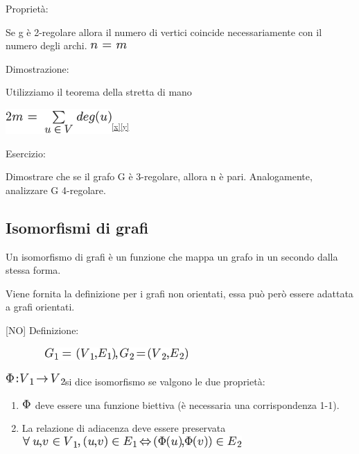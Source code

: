 \documentclass{article}
\providecommand{\tightlist}{%
  \setlength{\itemsep}{0pt}\setlength{\parskip}{0pt}}
\begin{document}
{}

{Proprietà}{: }

{Se g è 2-regolare allora il numero di vertici coincide necessariamente
con il numero degli archi. }\includegraphics{images/image424.png}

{}

{Dimostrazione}{: }

{Utilizziamo il teorema della stretta di mano}

\includegraphics{images/image425.png}\textsuperscript{\protect\hyperlink{cmnt24}{{[}x{]}}\protect\hyperlink{cmnt25}{{[}y{]}}}

{}

{Esercizio}{:}

{Dimostrare che se il grafo G è 3-regolare, allora n è pari.
Analogamente, analizzare G 4-regolare. }

{}

\hypertarget{h.d5v408sc7po0}{\subsection{\texorpdfstring{{Isomorfismi di
grafi}}{Isomorfismi di grafi}}\label{h.d5v408sc7po0}}

{}

{Un isomorfismo di grafi è un funzione che mappa un grafo in un secondo
dalla stessa forma.}

{Viene fornita la definizione per i grafi non orientati, essa può però
essere adattata a grafi orientati.}

{}

{{[}NO{]} Definizione:}

{~~~~~~~~}\includegraphics{images/image426.png}

\includegraphics{images/image427.png}{si dice isomorfismo se valgono le
due proprietà:}

\begin{enumerate}
\tightlist
\item
  \includegraphics{images/image428.png}{~deve essere una funzione
  biettiva (è necessaria una corrispondenza 1-1).}
\item
  {La relazione di adiacenza deve essere preservata\\
  }\includegraphics{images/image429.png}
\end{enumerate}
\end{document}
